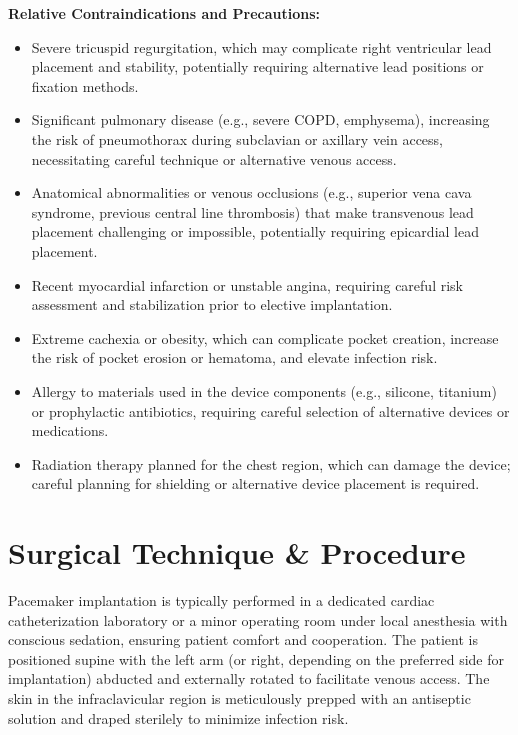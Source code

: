 \textbf{Relative Contraindications and Precautions:}
\begin{itemize}
  \item Severe tricuspid regurgitation, which may complicate right ventricular lead placement and stability, potentially requiring alternative lead positions or fixation methods.
  \item Significant pulmonary disease (e.g., severe COPD, emphysema), increasing the risk of pneumothorax during subclavian or axillary vein access, necessitating careful technique or alternative venous access.
  \item Anatomical abnormalities or venous occlusions (e.g., superior vena cava syndrome, previous central line thrombosis) that make transvenous lead placement challenging or impossible, potentially requiring epicardial lead placement.
  \item Recent myocardial infarction or unstable angina, requiring careful risk assessment and stabilization prior to elective implantation.
  \item Extreme cachexia or obesity, which can complicate pocket creation, increase the risk of pocket erosion or hematoma, and elevate infection risk.
  \item Allergy to materials used in the device components (e.g., silicone, titanium) or prophylactic antibiotics, requiring careful selection of alternative devices or medications.
  \item Radiation therapy planned for the chest region, which can damage the device; careful planning for shielding or alternative device placement is required.
\end{itemize}

\section*{Surgical Technique \& Procedure}
Pacemaker implantation is typically performed in a dedicated cardiac catheterization laboratory or a minor operating room under local anesthesia with conscious sedation, ensuring patient comfort and cooperation. The patient is positioned supine with the left arm (or right, depending on the preferred side for implantation) abducted and externally rotated to facilitate venous access. The skin in the infraclavicular region is meticulously prepped with an antiseptic solution and draped sterilely to minimize infection risk.

